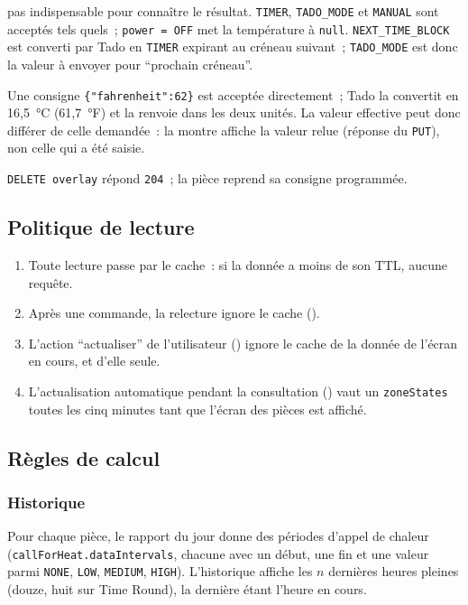 \begin{description}
    pas indispensable pour connaître le résultat. \texttt{TIMER}, \texttt{TADO\_MODE} et
    \texttt{MANUAL} sont acceptés tels quels~; \texttt{power = OFF} met la température à \texttt{null}.
    \texttt{NEXT\_TIME\_BLOCK} est converti par Tado en \texttt{TIMER} expirant au créneau suivant~;
    \texttt{TADO\_MODE} est donc la valeur à envoyer pour \enquote{prochain créneau}.
  \item[Fahrenheit.] Une consigne \texttt{\{"fahrenheit":62\}} est acceptée directement~; Tado la
    convertit en 16,5~°C (61,7~°F) et la renvoie dans les deux unités. La valeur effective peut donc
    différer de celle demandée~: la montre affiche la valeur relue (réponse du \texttt{PUT}), non celle
    qui a été saisie.
  \item[Retour à la programmation.] \texttt{DELETE overlay} répond \texttt{204}~; la pièce reprend
    sa consigne programmée.
\end{description}

\subsection{Politique de lecture}
\label{sec:lecture}

\begin{enumerate}
  \item Toute lecture passe par le cache~: si la donnée a moins de son TTL, aucune requête.
  \item Après une commande, la relecture ignore le cache ().
  \item L'action \enquote{actualiser} de l'utilisateur () ignore le cache de la
        donnée de l'écran en cours, et d'elle seule.
  \item L'actualisation automatique pendant la consultation () vaut un
        \texttt{zoneStates} toutes les cinq minutes tant que l'écran des pièces est affiché.
\end{enumerate}

\subsection{Règles de calcul}

\subsubsection{Historique}
\label{sec:calcul-historique}

Pour chaque pièce, le rapport du jour donne des périodes d'appel de chaleur
(\texttt{callForHeat.dataIntervals}, chacune avec un début, une fin et une valeur parmi
\texttt{NONE}, \texttt{LOW}, \texttt{MEDIUM}, \texttt{HIGH}). L'historique affiche les $n$ dernières heures
pleines (douze, huit sur Time Round), la dernière étant l'heure en cours.

